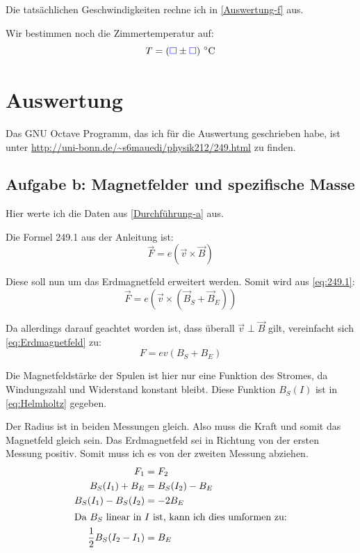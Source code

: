 \documentclass[11pt]{article}
\newcommand{\emesswert}{\left(\messwert \pm \messwert \right)}
\newcommand{\half}{\frac{1}{2}}
\newcommand{\messwert}{\textcolor{blue}{\square}}
\begin{document}
Die tatsächlichen Geschwindigkeiten rechne ich in \ref{Auswertung-f} aus.

Wir bestimmen noch die Zimmertemperatur auf:
\[ T = \unit[\emesswert]{^\circ C} \]


\section{Auswertung}

Das GNU Octave Programm, das ich für die Auswertung geschrieben habe, ist unter
\url{http://uni-bonn.de/~s6mauedi/physik212/249.html} zu finden.

\subsection{Aufgabe b: Magnetfelder und spezifische Masse}

\label{Auswertung-b}

Hier werte ich die Daten aus \ref{Durchführung-a} aus.

Die Formel 249.1 aus der Anleitung ist:
\begin{equation}
	\label{eq:249.1}
	\vec F = e \left( \vec v \times \vec B \right)
\end{equation}

Diese soll nun um das Erdmagnetfeld erweitert werden. Somit wird aus
\eqref{eq:249.1}:
\begin{equation}
	\label{eq:Erdmagnetfeld}
	\vec F = e \left( \vec v \times \left( \vec B_S + \vec B_E \right) \right)
\end{equation}

Da allerdings darauf geachtet worden ist, dass überall $\vec v \perp \vec B$
gilt, vereinfacht sich \eqref{eq:Erdmagnetfeld} zu:
\begin{equation}
	\label{eq:magnetische-Kraft}
	F = e v (B_S + B_E)
\end{equation}

Die Magnetfeldstärke der Spulen ist hier nur eine Funktion des Stromes, da
Windungszahl und Widerstand konstant bleibt. Diese Funktion $B_S(I)$ ist in
\eqref{eq:Helmholtz} gegeben.

Der Radius ist in beiden Messungen gleich. Also muss die Kraft und somit das
Magnetfeld gleich sein. Das Erdmagnetfeld sei in Richtung von der ersten
Messung positiv. Somit muss ich es von der zweiten Messung abziehen.
%
\begin{align*}
	F_1 &= F_2 \\
	B_S(I_1) + B_E &= B_S(I_2) - B_E \\
	B_S(I_1) - B_S(I_2) &= - 2 B_E \\
	\intertext{Da $B_S$ linear in $I$ ist, kann ich dies umformen zu:}
	\half B_S(I_2 - I_1) &= B_E \\
\end{align*}
\end{document}
